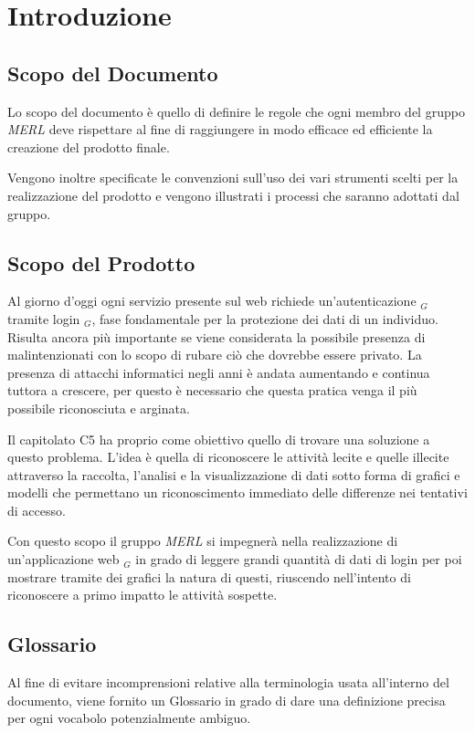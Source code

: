 \chapter{Introduzione}

\section{Scopo del Documento}
Lo scopo del documento è quello di definire le regole che ogni membro del gruppo \textit{MERL} deve rispettare al fine di raggiungere in modo efficace ed efficiente la creazione del prodotto finale.

Vengono inoltre specificate le convenzioni sull'uso dei vari strumenti scelti per la realizzazione del prodotto e vengono illustrati i processi che saranno adottati dal gruppo.

\section{Scopo del Prodotto}
Al giorno d'oggi ogni servizio presente sul web richiede un'autenticazione $_G$ tramite login $_G$, fase fondamentale per la protezione dei dati di un individuo. Risulta ancora più importante se viene considerata la possibile presenza di malintenzionati con lo scopo di rubare ciò che dovrebbe essere privato. La presenza di attacchi informatici negli anni è andata aumentando e continua tuttora a crescere, per questo è necessario che questa pratica venga il più possibile riconosciuta e arginata.

Il capitolato C5 ha proprio come obiettivo quello di trovare una soluzione a questo problema. L'idea è quella di riconoscere le attività lecite e quelle illecite attraverso la raccolta, l'analisi e la visualizzazione di dati sotto forma di grafici e modelli che permettano un riconoscimento immediato delle differenze nei tentativi di accesso.

Con questo scopo il gruppo \textit{MERL} si impegnerà nella realizzazione di un'applicazione web $_G$ in grado di leggere grandi quantità di dati di login per poi mostrare tramite dei grafici la natura di questi, riuscendo nell'intento di riconoscere a primo impatto le attività sospette.

\section{Glossario}
Al fine di evitare incomprensioni relative alla terminologia usata all'interno del documento, viene fornito un Glossario in grado di dare una definizione precisa per ogni vocabolo potenzialmente ambiguo.

